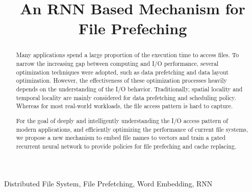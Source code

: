 \documentclass[conference]{IEEEtran}
\begin{document}
\title{An RNN Based Mechanism for File Prefeching\\
}

\author{
\and
{}
}

\maketitle

\begin{abstract}
    Many applications spend a large proportion of the execution time to access files.
    To narrow the increasing gap between computing and I/O performance, several optimization techniques were adopted, 
    such as data prefetching and data layout optimization. However, the effectiveness of these optimization processes heavily 
    depends on the understanding of the I/O behavior. Traditionally, spatial locality and temporal locality
    are mainly considered for data prefetching and scheduling policy. Whereas for most real-world workloads, the file access pattern 
    is hard to capture. 

    For the goal of deeply and intelligently understanding the I/O access pattern of modern applications, and efficiently optimizing the performance of current file systems,
    we propose a new mechanism to embed file names to vectors and train a gated recurrent neural network to provide policies for file prefeching and cache replacing.
\end{abstract}

\begin{IEEEkeywords}
    Distributed File System, File Prefetching, Word Embedding, RNN

\end{IEEEkeywords}
\end{document}
